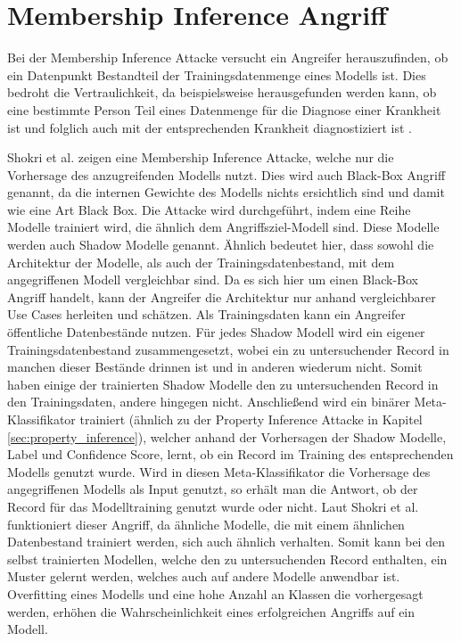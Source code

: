 \section{Membership Inference Angriff}\label{sec:membership_inference}

Bei der Membership Inference Attacke versucht ein Angreifer herauszufinden, ob ein Datenpunkt Bestandteil der Trainingsdatenmenge eines Modells ist. 
Dies bedroht die Vertraulichkeit, da beispielsweise herausgefunden werden kann, ob eine bestimmte Person Teil eines Datenmenge für die Diagnose einer Krankheit ist und folglich auch mit der entsprechenden Krankheit diagnostiziert ist \cite{P-2}.

Shokri et al. \cite{P-2} zeigen eine Membership Inference Attacke, welche nur die Vorhersage des anzugreifenden Modells nutzt. 
Dies wird auch Black-Box Angriff genannt, da die internen Gewichte des Modells nichts ersichtlich sind und damit wie eine Art Black Box.
Die Attacke wird durchgeführt, indem eine Reihe Modelle trainiert wird, die ähnlich dem Angriffsziel-Modell sind.
Diese Modelle werden auch Shadow Modelle genannt.
Ähnlich bedeutet hier, dass sowohl die Architektur der Modelle, als auch der Trainingsdatenbestand, mit dem angegriffenen Modell vergleichbar sind.
Da es sich hier um einen Black-Box Angriff handelt, kann der Angreifer die Architektur nur anhand vergleichbarer Use Cases herleiten und schätzen. 
Als Trainingsdaten kann ein Angreifer öffentliche Datenbestände nutzen.
Für jedes Shadow Modell wird ein eigener Trainingsdatenbestand zusammengesetzt, wobei ein zu untersuchender Record in manchen dieser Bestände drinnen ist und in anderen wiederum nicht.
Somit haben einige der trainierten Shadow Modelle den zu untersuchenden Record in den Trainingsdaten, andere hingegen nicht.
Anschließend wird ein binärer Meta-Klassifikator trainiert (ähnlich zu der Property Inference Attacke in Kapitel \ref{sec:property_inference}), welcher anhand der Vorhersagen der Shadow Modelle, Label und Confidence Score, lernt, ob ein Record im Training des entsprechenden Modells genutzt wurde.
Wird in diesen Meta-Klassifikator die Vorhersage des angegriffenen Modells als Input genutzt, so erhält man die Antwort, ob der Record für das Modelltraining genutzt wurde oder nicht.
Laut Shokri et al. \cite{P-2} funktioniert dieser Angriff, da ähnliche Modelle, die mit einem ähnlichen Datenbestand trainiert werden, sich auch ähnlich verhalten. 
Somit kann bei den selbst trainierten Modellen, welche den zu untersuchenden Record enthalten, ein Muster gelernt werden, welches auch auf andere Modelle anwendbar ist. 
Overfitting eines Modells und eine hohe Anzahl an Klassen die vorhergesagt werden, erhöhen die Wahrscheinlichkeit eines erfolgreichen Angriffs auf ein Modell.



